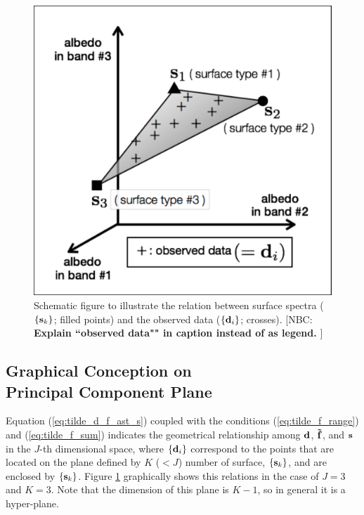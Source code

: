 \documentclass[iop,numberedappendix,apj]{emulateapj}
\def\fast{\tilde f}
\def\memoYF#1{\color{red}[YF: {\bf #1}]\color{black}}
\def\memoNBC#1{\color{blue}[NBC: {\bf #1}]\color{black}}
\begin{document}
\begin{figure}[b!]
    \begin{center}
\includegraphics[width=\hsize]{schematics.pdf}
    \end{center}
    \caption{Schematic figure to illustrate the relation between surface spectra ($\{{\bf s}_k\} $; filled points) and the observed data ($\{{\bf d}_i\} $; crosses). \memoNBC{Explain ``observed data"" in caption instead of as legend. }}
\label{fig:schematic}
\end{figure}


\subsection{Graphical Conception on \\Principal Component Plane}
\label{ss:PCplane}


Equation (\ref{eq:tilde_d_f_ast_s}) coupled with the conditions (\ref{eq:tilde_f_range}) and (\ref{eq:tilde_f_sum}) indicates the geometrical relationship among ${\bf d}$, ${\bf \fast }$, and ${\bf s}$ in the $J$-th dimensional space, where $\{{\bf d}_i\}$ correspond to the points that are located on the plane defined by $K$ ($<J$) number of surface, $\{{\bf s}_k\} $, and are enclosed by $\{{\bf s}_k \}$. 
Figure \ref{fig:schematic} graphically shows this relations in the case of $J=3$ and $K=3$. 
Note that the dimension of this plane is $K-1$, so in general it is a hyper-plane.  
\end{document}
